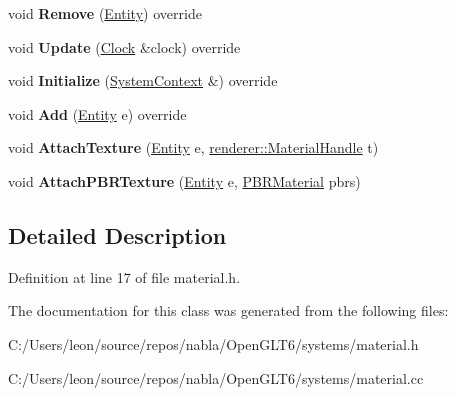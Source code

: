 \begin{DoxyCompactItemize}
\item 
\mbox{\label{classnabla_1_1_matrial_systerm_ae327fe7f9c741f1118cad7f2b66c708a}} 
void {\bfseries Remove} (\mbox{\hyperlink{structnabla_1_1_entity}{Entity}}) override
\item 
\mbox{\label{classnabla_1_1_matrial_systerm_a9ed69308419a04583d6276965bdb5520}} 
void {\bfseries Update} (\mbox{\hyperlink{classnabla_1_1_clock}{Clock}} \&clock) override
\item 
\mbox{\label{classnabla_1_1_matrial_systerm_ace79f2576ae8c8821ba153eb0b1fee35}} 
void {\bfseries Initialize} (\mbox{\hyperlink{structnabla_1_1_system_context}{System\+Context}} \&) override
\item 
\mbox{\label{classnabla_1_1_matrial_systerm_a352df0818f45c65778bdd4fa7c65bd23}} 
void {\bfseries Add} (\mbox{\hyperlink{structnabla_1_1_entity}{Entity}} e) override
\item 
\mbox{\label{classnabla_1_1_matrial_systerm_a26330d88a9446b7db84f22980e7f25bc}} 
void {\bfseries Attach\+Texture} (\mbox{\hyperlink{structnabla_1_1_entity}{Entity}} e, \mbox{\hyperlink{classnabla_1_1renderer_1_1_handle}{renderer\+::\+Material\+Handle}} t)
\item 
\mbox{\label{classnabla_1_1_matrial_systerm_a96d00f84cfb75e847336e21fb5ae1abf}} 
void {\bfseries Attach\+P\+B\+R\+Texture} (\mbox{\hyperlink{structnabla_1_1_entity}{Entity}} e, \mbox{\hyperlink{structnabla_1_1_matrial_systerm_1_1_p_b_r_material}{P\+B\+R\+Material}} pbrs)
\end{DoxyCompactItemize}


\subsection{Detailed Description}


Definition at line 17 of file material.\+h.



The documentation for this class was generated from the following files\+:\begin{DoxyCompactItemize}
\item 
C\+:/\+Users/leon/source/repos/nabla/\+Open\+G\+L\+T6/systems/material.\+h\item 
C\+:/\+Users/leon/source/repos/nabla/\+Open\+G\+L\+T6/systems/material.\+cc\end{DoxyCompactItemize}
